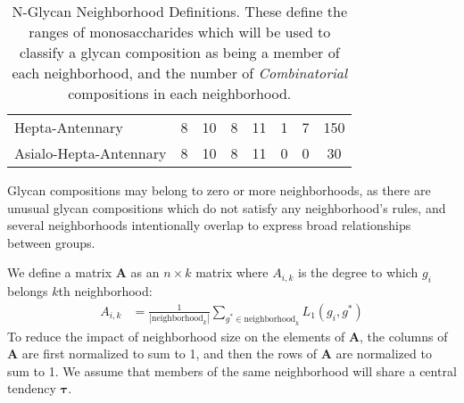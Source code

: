\begin{table}[tb]
\begin{tabular}{l |S|S| S|S| S|S| S}
                Hepta-Antennary       &     8         &     10     &       8     &     11    &       1       &      7    &  150\\
                Asialo-Hepta-Antennary&     8         &     10     &       8     &     11    &       0       &      0    &  30\\
                \bottomrule
            \end{tabular}
            \caption{N-Glycan Neighborhood Definitions. These define the ranges of monosaccharides which
            will be used to classify a glycan composition as being a member of each neighborhood, and the number
            of \textit{Combinatorial} \nglycan compositions in each neighborhood.}
            \label{tab:neighborhood_definitions}
        \end{table}

        Glycan compositions may belong to zero or more neighborhoods,
        as there are unusual glycan compositions which do not satisfy
        any neighborhood's rules, and several neighborhoods intentionally
        overlap to express broad relationships between groups.

        We define a matrix $\mathbf{A}$ as an $n \times k$ matrix where
        $A_{i, k}$ is the degree to which $g_i$ belongs $k$th neighborhood:
        \begin{align}
            A_{i, k} &= \frac{1}{|\text{neighborhood}_k|}\sum_{
                g^* \in \text{neighborhood}_k}{L_1(g_i, g^*)}
        \end{align}
        To reduce the impact of neighborhood size on the elements
        of $\mathbf{A}$, the columns of $\mathbf{A}$ are first
        normalized to sum to 1, and then the rows of $\mathbf{A}$
        are normalized to sum to 1. We assume that members of the
        same neighborhood will share a central tendency $\mathbf{\tau}$.
